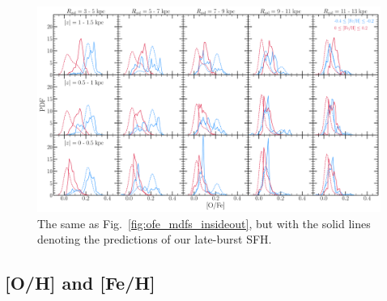 \documentclass[a4paper, fleqn, usenatbib, useAMS]{mnras}
\begin{document}
\begin{figure} 
\centering 
\includegraphics[scale = 0.32]{ofe_mdfs_lateburst.pdf} 
\caption{The same as Fig.~\ref{fig:ofe_mdfs_insideout}, but with the solid 
lines denoting the predictions of our late-burst SFH. } 
\label{fig:ofe_mdfs_lateburst} 
\end{figure} 

\subsection{[O/H] and [Fe/H]} 
\label{sec:mdfs:oh_feh} 
\end{document}
